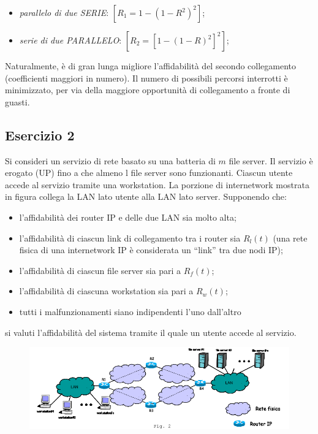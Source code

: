\begin{itemize}

\item{\textit{parallelo di due SERIE}}: $[R_1=1-(1-R^2)^2]$;
\item{\textit{serie di due PARALLELO}}: $[R_2=[1-(1-R)^2]^2]$;

\end{itemize}


Naturalmente, è di gran lunga migliore l'affidabilità del secondo collegamento (coefficienti maggiori in numero). Il numero di possibili percorsi interrotti è minimizzato, per via della maggiore opportunità di collegamento a fronte di guasti.


\subsection{Esercizio 2}

Si consideri un servizio di rete basato su una batteria di $m$ file server. Il servizio è erogato (UP) fino a che almeno l file server sono funzionanti. Ciascun utente accede al servizio tramite una workstation. La porzione di internetwork mostrata in figura collega la LAN lato utente alla LAN lato server. Supponendo che:

\begin{itemize}

\item l’affidabilità dei router IP e delle due LAN sia molto alta;
\item l’affidabilità di ciascun link di collegamento tra i router sia $R_l(t)$ (una rete fisica di una internetwork IP è considerata un “link” tra due nodi IP);
\item l’affidabilità di ciascun file server sia pari a $R_f(t)$;
\item l’affidabilità di ciascuna workstation sia pari a $R_w(t)$;
\item tutti i malfunzionamenti siano indipendenti l’uno dall’altro

\end{itemize}

si valuti l’affidabilità del sistema tramite il quale un utente accede al servizio.

\begin{center}
\begin{figure}[H]
\centering
\includegraphics[scale=0.8]{figures/ex/hw12.png}
\end{figure}
\end{center}

